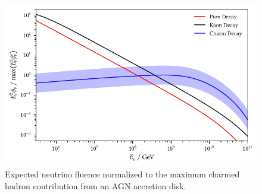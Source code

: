 \begin{figure}[H]
	\centering
	\includegraphics{../plots/build/nucleus_neutrino_spectrum.pdf}
	\caption[AGN accretion disk $\nu \kern+0.5pt$ fluence compared to $c$ decay.]
			{Expected neutrino fluence normalized to the maximum charmed hadron contribution from an AGN accretion disk.}
	\label{fig:nucleus-fluence}
\end{figure}
